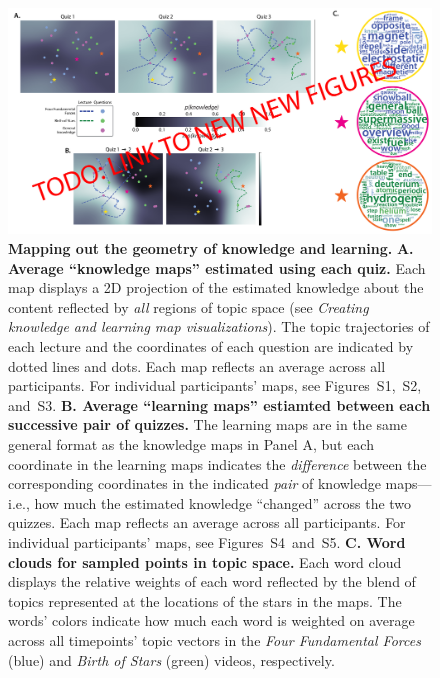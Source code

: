 \documentclass[10pt]{article}
\newcommand{\individualKnowledgeMapsA}{S1}
\newcommand{\individualKnowledgeMapsB}{S2}
\newcommand{\individualKnowledgeMapsC}{S3}
\newcommand{\individualLearningMapsA}{S4}
\newcommand{\individualLearningMapsB}{S5}
\begin{document}
\begin{figure}[tp]
    \centering
    \includegraphics[width=\textwidth]{figs/knowledge_and_learning_maps}
    
    \caption{\textbf{Mapping out the geometry of knowledge and learning.}
    \textbf{A. Average ``knowledge maps'' estimated using each quiz.} Each map
    displays a 2D projection of the estimated knowledge about the content
    reflected by \textit{all} regions of topic space (see \textit{Creating
    knowledge and learning map visualizations}). The topic trajectories of each
    lecture and the coordinates of each question are indicated by dotted lines
    and dots. Each map reflects an average across all participants. For
    individual participants' maps, see
    Figures~\individualKnowledgeMapsA,~\individualKnowledgeMapsB,
    and~\individualKnowledgeMapsC. \textbf{B. Average ``learning maps''
    estiamted between each successive pair of quizzes.} The learning maps are
    in the same general format as the knowledge maps in Panel A, but each
    coordinate in the learning maps indicates the \textit{difference} between
    the corresponding coordinates in the indicated \textit{pair} of knowledge
    maps---i.e., how much the estimated knowledge ``changed'' across the two
    quizzes. Each map reflects an average across all participants. For
    individual participants' maps, see
    Figures~\individualLearningMapsA~and~\individualLearningMapsB. \textbf{C.
    Word clouds for sampled points in topic space.} Each word cloud displays
    the relative weights of each word reflected by the blend of topics
    represented at the locations of the stars in the maps. The words' colors
    indicate how much each word is weighted on average across all timepoints'
    topic vectors in the \textit{Four Fundamental Forces} (blue) and
    \textit{Birth of Stars} (green) videos, respectively.}
    
    \label{fig:knowledge-maps}
    \end{figure}
\end{document}
